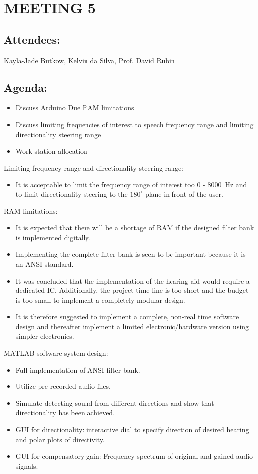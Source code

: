 \documentclass[10pt,onecolumn]{witseiepaper}
\begin{document}
\section*{MEETING 5}
\subsection*{Attendees:}
Kayla-Jade Butkow, Kelvin da Silva, Prof. David Rubin
\subsection*{Agenda:} 
\begin{itemize}
	\item Discuss Arduino Due RAM limitations
	\item Discuss limiting frequencies of interest to speech frequency range and limiting directionality steering range
	\item Work station allocation
\end{itemize}

Limiting frequency range and directionality steering range:
\begin{itemize}
	\item It is acceptable to limit the frequency range of interest too 0 - 8000~Hz and to limit directionality steering to the $180^{\circ}$ plane in front of the user.
\end{itemize}

RAM limitations:
\begin{itemize}
	\item It is expected that there will be a shortage of RAM if the designed filter bank is implemented digitally.
	\item Implementing the complete filter bank is seen to be important because it is an ANSI standard.
	\item It was concluded that the implementation of the hearing aid would require a dedicated IC. Additionally, the project time line is too short and the budget is too small to implement a completely modular design.
	\item It is therefore suggested to implement a complete, non-real time software design and thereafter implement a limited electronic/hardware version using simpler electronics.
\end{itemize}

MATLAB software system design:
\begin{itemize}
	\item Full implementation of ANSI filter bank.
	\item Utilize pre-recorded audio files.
	\item Simulate detecting sound from different directions and show that directionality has been achieved.
	\item GUI for directionality: interactive dial to specify direction of desired hearing and polar plots of directivity.
	\item GUI for compensatory gain: Frequency spectrum of original and gained audio signals.
\end{itemize}
\end{document}
